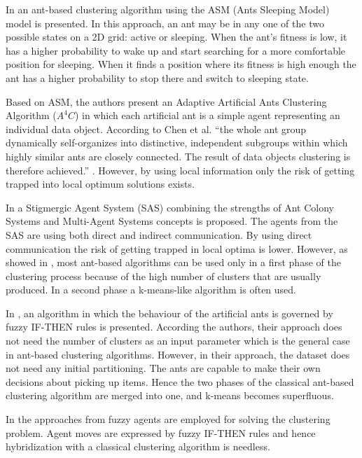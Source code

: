 In \cite{Chen04AnAdaptive} an ant-based clustering algorithm using the ASM (Ants Sleeping Model) model is presented. In this approach, an ant may be in any one of the two possible states on a 2D grid: active or sleeping. When the  ant's fitness is low, it has a higher probability to wake up and start searching for a more comfortable position for sleeping.  When it finds a position where its fitness is high enough the ant has a higher probability to stop there and switch to sleeping state. 

Based on ASM, the authors present an Adaptive Artificial Ants Clustering Algorithm ($A^{4}C$) \cite{Chen04AnAdaptive} in which each artificial ant is a simple agent representing an individual data object. According to Chen et al. ``the whole ant group dynamically self-organizes into distinctive, independent subgroups within which highly similar ants are closely connected. The result of data objects clustering is therefore achieved.'' \cite{Chen04AnAdaptive}. However, by using local information only the risk of getting trapped into local optimum solutions exists.

In \cite{Chira07Stigmergic} a Stigmergic Agent System (SAS) combining the strengths of Ant Colony Systems and Multi-Agent Systems concepts is proposed. The agents from the SAS are using both direct and indirect communication. By using direct communication the risk of getting trapped in local optima is lower. However, as showed in \cite{Schockaert04Fuzzy}, most ant-based algorithms can be used only in a first phase of the clustering process because of the high number of clusters that are usually produced. In a second phase a k-means-like algorithm is often used. 

In \cite{Schockaert04Fuzzy}, an algorithm in which the behaviour of the artificial ants is governed by fuzzy IF-THEN rules is presented. According  the authors, their approach does not need the number of clusters as an input parameter which is the general case in ant-based clustering algorithms. However, in their approach,  the dataset does not need any initial partitioning. The ants are capable to make their own decisions about picking up items. Hence the two phases of the classical ant-based clustering algorithm are merged into one, and k-means becomes superfluous.

In the approaches from \cite{Gaceanu10AnAdaptive, Gaceanu11AContext} fuzzy agents are employed for solving the clustering problem. Agent moves are expressed by fuzzy IF-THEN rules and hence hybridization with a classical clustering algorithm is needless.

